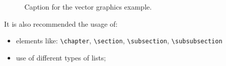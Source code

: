 \begin{figure}[t]
  \centering
  \caption[Vector graphics example]%
  {Caption for the vector graphics example.}
  \label{fig:ALAP:sm3}
\end{figure}

It is also recommended the usage of:
\begin{itemize}
	\item elements like: \verb+\chapter+, \verb+\section+, \verb+\subsection+, \verb+\subsubsection+
	\item use of different types of lists;
\end{itemize}